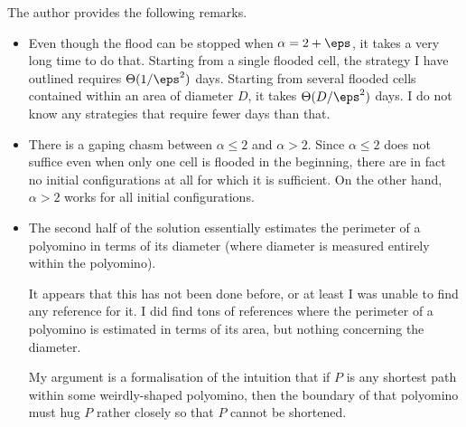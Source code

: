 \begin{remark*}
  The author provides the following remarks.
  \begin{itemize}
  \item Even though the flood can be stopped when $\alpha = 2 + \eps$, it takes a very long time to do that. Starting from a single flooded cell, the strategy I have outlined requires $\Theta(1 / \eps^2)$ days. Starting from several flooded cells contained within an area of diameter $D$, it takes $\Theta( D / \eps^2)$ days. I do not know any strategies that require fewer days than that.
  \item There is a gaping chasm between $\alpha \le 2$ and $\alpha > 2$. Since $\alpha \le 2$ does not suffice even when only one cell is flooded in the beginning, there are in fact no initial configurations at all for which it is sufficient. On the other hand, $\alpha > 2$ works for all initial configurations.
  \item The second half of the solution essentially estimates the perimeter of a polyomino in terms of its diameter (where diameter is measured entirely within the polyomino).

  It appears that this has not been done before, or at least I was unable to find any reference for it. I did find tons of references where the perimeter of a polyomino is estimated in terms of its area, but nothing concerning the diameter.

  My argument is a formalisation of the intuition that if $P$ is any shortest path within some weirdly-shaped polyomino, then the boundary of that polyomino must hug $P$ rather closely so that $P$ cannot be shortened.
  \end{itemize}
\end{remark*}
